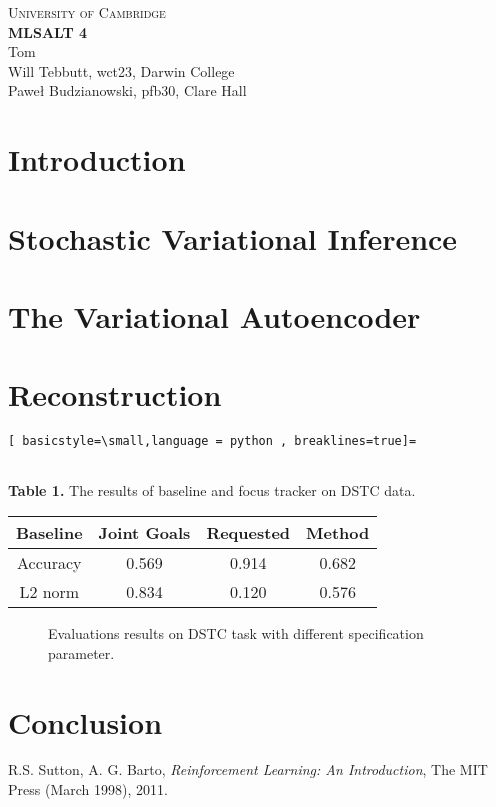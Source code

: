 \documentclass[10pt,a4paper]{article}
\begin{document}
\begin{center}
\Large{\textsc{
University of Cambridge}}\\
\vspace{.5cm}
\large\textbf{MLSALT 4}\\
\vspace{.5cm}
\large{Tom}\\
\large{Will Tebbutt, wct23, Darwin College}\\
\large{Paweł Budzianowski, pfb30, Clare Hall}\\
\end{center} 

\section{Introduction}


\section{Stochastic Variational Inference}


\section{The Variational Autoencoder}


\section{Reconstruction}


\begin{lstlisting}[ basicstyle=\small,language = python , breaklines=true]=


\end{lstlisting}



 {\small \textbf{Table 1.} The results of baseline and focus tracker on DSTC data.}
\begin{center}
\begin{tabular}{c | c c c} \label{tab1}
Baseline &  Joint Goals & Requested & Method \\ \hline 
Accuracy & 0.569 & 0.914 & 0.682\\
L2 norm & 0.834  & 0.120& 0.576\\
\end{tabular} 
\end{center}

\begin{figure}[!htb]
%
\endminipage 
{}  
\endminipage\hfill
  \caption[1]{Evaluations results on DSTC task with different specification parameter.}
\end{figure}

\section{Conclusion}


\begin{thebibliography}{15}
 R.S. Sutton, A. G. Barto, \emph{Reinforcement Learning: An Introduction}, The MIT Press (March 1998), 2011.


\end{thebibliography}
\end{document}
